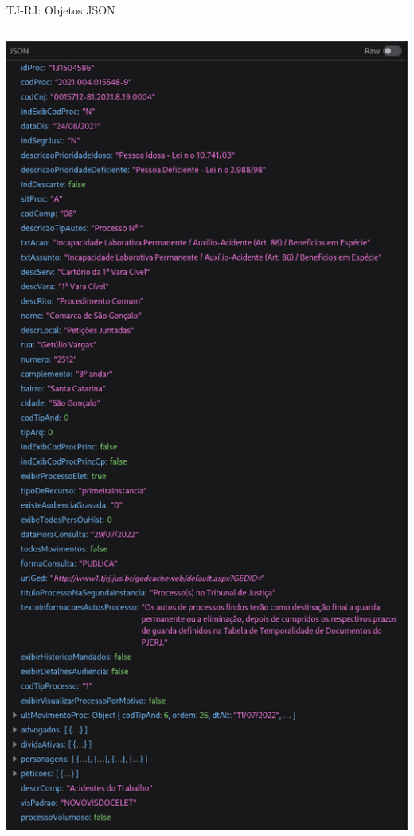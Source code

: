 \begin{frame}{TJ-RJ: Objetos JSON}
\begin{columns}
\begin{column}{0.5\textwidth}
\begin{center}
                \includegraphics[keepaspectratio,height=0.7\textheight]{img/tj-rj-ww3-resposta-antiga-campos}
            \end{center}
        \end{column}
    \end{columns}
\end{frame}

